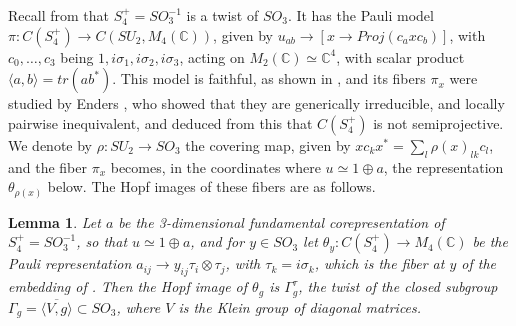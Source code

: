 \documentclass[11pt]{amsart}
\newtheorem{lemma}[theorem]{Lemma}
\begin{document}
\noindent Recall from \cite{bb2} that $S_4^+=SO_3^{-1}$ is a twist of $SO_3$. It has the Pauli model $\pi:C(S_4^+)\to C(SU_2,M_4(\mathbb C))$, given by $u_{ab}\to[x\to Proj(c_axc_b)]$, with $c_0,\ldots,c_3$ being $1,i\sigma_1,i\sigma_2,i\sigma_3$, acting on $M_2(\mathbb C)\simeq\mathbb C^4$, with scalar product $\langle a,b\rangle=tr(ab^*)$. This model is faithful, as shown in \cite{bc}, and its fibers $\pi_x$ were studied by Enders \cite{en}, who showed that they are generically irreducible, and locally pairwise inequivalent, and deduced from this that $C(S_4^+)$ is not semiprojective. We denote by $\rho:SU_2\to SO_3$ the covering map, given by $xc_kx^*=\sum_l\rho(x)_{lk}c_l$, and the fiber $\pi_x$ becomes, in the coordinates where $u\simeq1\oplus a$, the representation $\theta_{\rho(x)}$ below. The Hopf images of these fibers are as follows.

\begin{lemma}\label{lem:pauli}
Let $a$ be the 3-dimensional fundamental corepresentation of $S_4^+=SO_3^{-1}$, so that $u\simeq1\oplus a$, and for $y\in SO_3$ let $\theta_y:C(S_4^+)\to M_4(\mathbb C)$ be the Pauli representation $a_{ij}\to y_{ij}\tau_i\otimes\tau_j$, with $\tau_k=i\sigma_k$, which is the fiber at $y$ of the embedding of \cite[Theorem 5.1]{bb2}. Then the Hopf image of $\theta_g$ is $\Gamma_g^\tau$, the twist of the closed subgroup $\Gamma_g=\overline{\langle V,g\rangle}\subset SO_3$, where $V$ is the Klein group of diagonal matrices.
\end{lemma}
\end{document}

